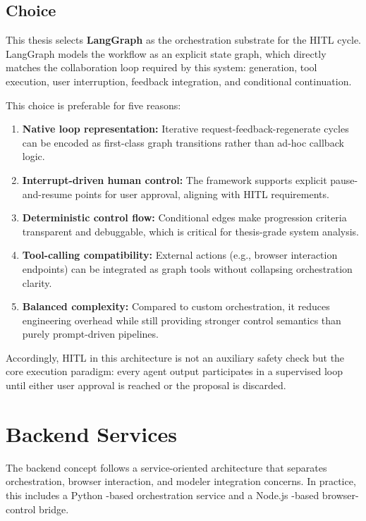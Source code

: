 \subsection{Choice}
This thesis selects \textbf{LangGraph} as the orchestration substrate for the HITL cycle. LangGraph models the workflow as an explicit state graph, which directly matches the collaboration loop required by this system: generation, tool execution, user interruption, feedback integration, and conditional continuation.

This choice is preferable for five reasons:
\begin{enumerate}
    \item \textbf{Native loop representation:} Iterative request-feedback-regenerate cycles can be encoded as first-class graph transitions rather than ad-hoc callback logic.
    \item \textbf{Interrupt-driven human control:} The framework supports explicit pause-and-resume points for user approval, aligning with HITL requirements.
    \item \textbf{Deterministic control flow:} Conditional edges make progression criteria transparent and debuggable, which is critical for thesis-grade system analysis.
    \item \textbf{Tool-calling compatibility:} External actions (e.g., browser interaction endpoints) can be integrated as graph tools without collapsing orchestration clarity.
    \item \textbf{Balanced complexity:} Compared to custom orchestration, it reduces engineering overhead while still providing stronger control semantics than purely prompt-driven pipelines.
\end{enumerate}

Accordingly, HITL in this architecture is not an auxiliary safety check but the core execution paradigm: every agent output participates in a supervised loop until either user approval is reached or the proposal is discarded.

\section{Backend Services}
The backend concept follows a service-oriented architecture that separates orchestration, browser interaction, and modeler integration concerns. In practice, this includes a Python \cite{python}-based orchestration service and a Node.js \cite{nodejsNodejsJavaScript}-based browser-control bridge.

